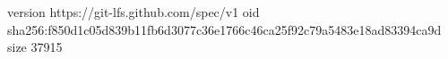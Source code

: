 version https://git-lfs.github.com/spec/v1
oid sha256:f850d1c05d839b11fb6d3077c36e1766c46ca25f92c79a5483e18ad83394ca9d
size 37915
